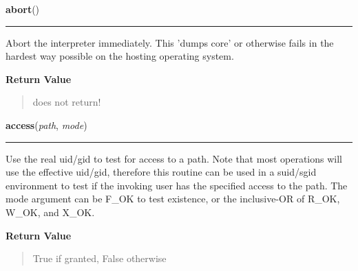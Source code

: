 \hspace{.8\funcindent}\begin{boxedminipage}{\funcwidth}

    \raggedright \textbf{abort}()

    \vspace{-1.5ex}

    \rule{\textwidth}{0.5\fboxrule}
\setlength{\parskip}{2ex}
    Abort the interpreter immediately.  This 'dumps core' or otherwise 
    fails in the hardest way possible on the hosting operating system.

\setlength{\parskip}{1ex}
      \textbf{Return Value}
    \vspace{-1ex}

      \begin{quote}
      does not return!

      \end{quote}

    \end{boxedminipage}

    \label{os:access}

    \vspace{0.5ex}

\hspace{.8\funcindent}\begin{boxedminipage}{\funcwidth}

    \raggedright \textbf{access}(\textit{path}, \textit{mode})

    \vspace{-1.5ex}

    \rule{\textwidth}{0.5\fboxrule}
\setlength{\parskip}{2ex}
    Use the real uid/gid to test for access to a path.  Note that most 
    operations will use the effective uid/gid, therefore this routine can 
    be used in a suid/sgid environment to test if the invoking user has the
    specified access to the path.  The mode argument can be F\_OK to test 
    existence, or the inclusive-OR of R\_OK, W\_OK, and X\_OK.

\setlength{\parskip}{1ex}
      \textbf{Return Value}
    \vspace{-1ex}

      \begin{quote}
      True if granted, False otherwise

      \end{quote}

    \end{boxedminipage}

